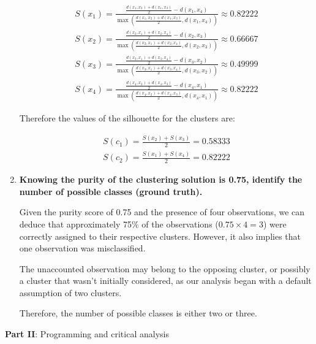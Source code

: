 \documentclass[12pt]{article}
\begin{document}
\begin{enumerate}[leftmargin=\labelsep]
          \begin{align*}
              S(x_1) = \frac{\frac{d(x_1, x_2) + d(x_1, x_3)}{2} - d(x_1,x_4)}{\max(\frac{d(x_1, x_2) + d(x_1, x_3)}{2}, d(x_1,x_4))} \approx 0.82222 \\
              S(x_2) = \frac{\frac{d(x_2, x_1) + d(x_2, x_4)}{2} - d(x_2,x_3)}{\max(\frac{d(x_2, x_1) + d(x_2, x_4)}{2}, d(x_2,x_3))} \approx 0.66667 \\
              S(x_3) = \frac{\frac{d(x_3, x_1) + d(x_3, x_4)}{2} - d(x_3,x_2)}{\max(\frac{d(x_3, x_1) + d(x_3, x_4)}{2}, d(x_3,x_2))} \approx 0.49999 \\
              S(x_4) = \frac{\frac{d(x_4, x_2) + d(x_4, x_3)}{2} - d(x_4,x_1)}{\max(\frac{d(x_4, x_2) + d(x_4, x_3)}{2}, d(x_4,x_1))} \approx 0.82222
           \end{align*}

           Therefore the values of the silhouette for the clusters are:

          \begin{align*}
              S(c_1) = \frac{S(x_2) + S(x_3)}{2} = 0.58333 \\
              S(c_2) = \frac{S(x_1) + S(x_4)}{2} = 0.82222
           \end{align*}


    \item \textbf{Knowing the purity of the clustering solution is 0.75, identify the number of possible classes (ground truth).}

          \vskip 0.3cm
          Given the purity score of 0.75 and the presence of four observations, we can deduce that approximately 75\% of the observations ($0.75 \times 4 = 3$)
           were correctly assigned to their respective clusters. However, it also implies that one observation was misclassified.

          The unaccounted observation may belong to the opposing cluster, or possibly a cluster that wasn't initially considered, as our analysis began with a
           default assumption of two clusters.

          Therefore, the number of possible classes is either two or three.
\end{enumerate}

\vskip 0.5cm

\begin{center}
\large{\textbf{Part II}: Programming and critical analysis}\normalsize
\end{center}
\end{document}
